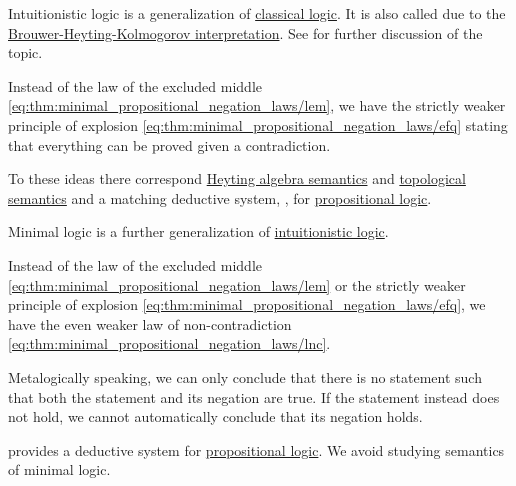 \begin{remark}\label{rem:intuitionistic_logic}
  Intuitionistic logic is a generalization of \hyperref[rem:classical_logic]{classical logic}. It is also called  due to the \hyperref[rem:brouwer_heyting_kolmogorov_interpretation]{Brouwer-Heyting-Kolmogorov interpretation}. See  for further discussion of the topic.

  Instead of the law of the excluded middle \eqref{eq:thm:minimal_propositional_negation_laws/lem}, we have the strictly weaker principle of explosion \eqref{eq:thm:minimal_propositional_negation_laws/efq} stating that everything can be proved given a contradiction.

  To these ideas there correspond \hyperref[def:propositional_heyting_algebra_semantics]{Heyting algebra semantics} and \hyperref[def:propositional_topological_semantics]{topological semantics} and a matching deductive system, , for \hyperref[subsec:propositional_logic]{propositional logic}.
\end{remark}

\begin{remark}\label{rem:minimal_logic}
  Minimal logic is a further generalization of \hyperref[rem:intuitionistic_logic]{intuitionistic logic}.

  Instead of the law of the excluded middle \eqref{eq:thm:minimal_propositional_negation_laws/lem} or the strictly weaker principle of explosion \eqref{eq:thm:minimal_propositional_negation_laws/efq}, we have the even weaker law of non-contradiction \eqref{eq:thm:minimal_propositional_negation_laws/lnc}.

  Metalogically speaking, we can only conclude that there is no statement such that both the statement and its negation are true. If the statement instead does not hold, we cannot automatically conclude that its negation holds.

   provides a deductive system for \hyperref[subsec:propositional_logic]{propositional logic}. We avoid studying semantics of minimal logic.
\end{remark}

